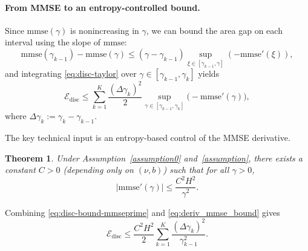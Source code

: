 \documentclass[11pt]{article}
\newtheorem{theorem}{Theorem}
\theoremstyle{definition}
\numberwithin{equation}{section}
\begin{document}
\paragraph{From MMSE to an entropy-controlled bound.}
Since $\mathrm{mmse}(\gamma)$ is nonincreasing in $\gamma$, we can bound the area gap on each interval using the slope of $\mathrm{mmse}$:
\begingroup
\small
\begin{equation}\label{eq:disc-taylor}
\mathrm{mmse}(\gamma_{k-1})-\mathrm{mmse}(\gamma)
\le (\gamma-\gamma_{k-1})\sup_{\xi\in[\gamma_{k-1},\gamma]}(-\mathrm{mmse}'(\xi)),
\end{equation}
\endgroup
and integrating \eqref{eq:disc-taylor} over $\gamma\in[\gamma_{k-1},\gamma_k]$ yields
\begin{equation}\label{eq:disc-bound-mmseprime}
\mathcal E_{\mathrm{disc}}
\le
\sum_{k=1}^K \frac{(\Delta\gamma_k)^2}{2}
\sup_{\gamma\in[\gamma_{k-1},\gamma_k]}\big(-\mathrm{mmse}'(\gamma)\big),
\end{equation}
where $\Delta\gamma_k:=\gamma_k-\gamma_{k-1}.$

The key technical input is an entropy-based control of the MMSE derivative.

\begin{theorem}\label{thm:deriv_mmse_bound}
Under Assumption~\ref{assumption0} and~\ref{assumption}, there exists a constant $C>0$ (depending only on $(\nu,b)$) such that for all $\gamma>0$,
\begin{equation}\label{eq:deriv_mmse_bound}
|\mathrm{mmse}'(\gamma)| \le \frac{C^2 H^2}{\gamma^2}.
\end{equation}
\end{theorem}

Combining \eqref{eq:disc-bound-mmseprime} and \eqref{eq:deriv_mmse_bound} gives
\begin{equation}\label{eq:disc-bound-grid}
\mathcal E_{\mathrm{disc}}
\le
\frac{C^2H^2}{2}\sum_{k=1}^K \frac{(\Delta\gamma_k)^2}{\gamma_{k-1}^2}.
\end{equation}
\end{document}
